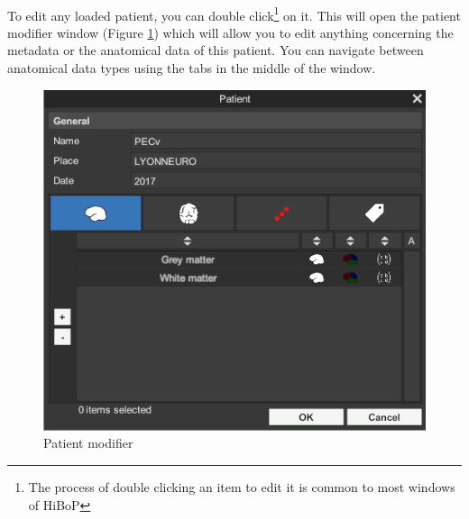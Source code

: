 \documentclass[a4paper]{article}
\begin{document}
\paragraph{} To edit any loaded patient, you can double click\footnote{The process of double clicking an item to edit it is common to most windows of HiBoP} on it. This will open the patient modifier window (Figure \ref{patientModifierUI}) which will allow you to edit anything concerning the metadata or the anatomical data of this patient. You can navigate between anatomical data types using the tabs in the middle of the window.
\begin{figure}[H]
\begin{center}
\includegraphics[scale=0.5]{PatientModifier.png}
\end{center}
\caption{\label{patientModifierUI}Patient modifier}
\end{figure}
\end{document}
